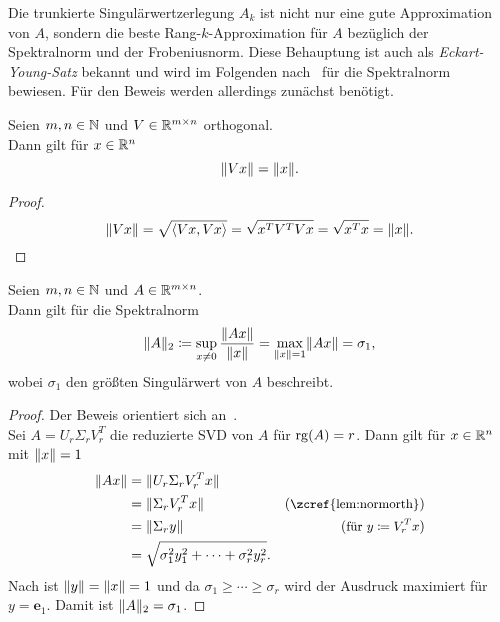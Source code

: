 Die trunkierte Singulärwertzerlegung \(A_{k}\) ist nicht nur eine gute Approximation von \(A\), sondern die beste Rang-\(k\)-Approximation für \(A\) bezüglich der Spektralnorm und der Frobeniusnorm.
Diese Behauptung ist auch als \emph{Eckart-Young-Satz} bekannt und wird im Folgenden nach~\cite[7]{zhangLinearAlgebraData2022} für die Spektralnorm bewiesen.
Für den Beweis werden allerdings zunächst  benötigt.
\begin{lemma}\label{lem:normorth}
    Seien \(m,n \in \mathbb{N}\) und \(V \in \mathbb{R}^{m \times n}\) orthogonal. \\
    Dann gilt für \(x \in \mathbb{R}^{n}\)
    \begin{equation*}
        \lVert Vx\rVert = \lVert x\rVert.
    \end{equation*} 
\end{lemma}
\begin{proof}
    \begin{equation*}
    \lVert Vx\rVert = \sqrt{\langle Vx,Vx \rangle} = \sqrt{x^{T}V^{T}Vx} = \sqrt{x^{T}x} = \lVert x\rVert.
    \end{equation*}
\end{proof}
\begin{lemma}\label{lem:eck}
    Seien \(m,n \in \mathbb{N}\) und \(A \in \mathbb{R}^{m \times n}\). \\
    Dann gilt für die Spektralnorm
    \begin{equation*}
        \lVert A\rVert_{2} \coloneq\sup\limits_{x \neq 0} \frac{\lVert Ax\rVert}{\lVert x\rVert} = \max\limits_{\lVert x\rVert=1} \lVert Ax\rVert = \sigma_{1},
    \end{equation*}
    wobei \(\sigma_{1}\) den größten Singulärwert von \(A\) beschreibt. 
\end{lemma}
\begin{proof}
    Der Beweis orientiert sich an~\cite[7]{frazzoliDynamicSystemsControl2011}.\\
    Sei \(A = U_{r}\Sigma_{r} V^{T}_{r}\) die reduzierte SVD von \(A\) für \(\operatorname{rg}(A) = r\).
    Dann gilt für \(x \in \mathbb{R}^{n}\) mit \(\lVert x\rVert = 1\)  
    \begin{align*}
        \norm{Ax} &= \norm{U_{r}\Sigma_{r} V^{T}_{r}x} \\
        &= \norm{\Sigma_{r} V^{T}_{r}x} \qquad & {(\text{\small\zcref{lem:normorth}})} \\
        &= \norm{\Sigma_{r} y} & {(\text{\small für \(y \coloneq V^{T}_{r}x\)})} \\
        &= \sqrt{\sigma_{1}^{2}y_{1}^{2} + \cdots + \sigma_{r}^{2}y_{r}^{2}}.
    \end{align*}
    Nach  ist \(\lVert y\rVert = \lVert x\rVert = 1\) und da \(\sigma_{1} \geq \cdots \geq \sigma_{r}\) wird der Ausdruck maximiert für \(y = \symbf{e}_{1}\).
    Damit ist \(\lVert A\rVert_{2} = \sigma_{1}\).    
\end{proof}
